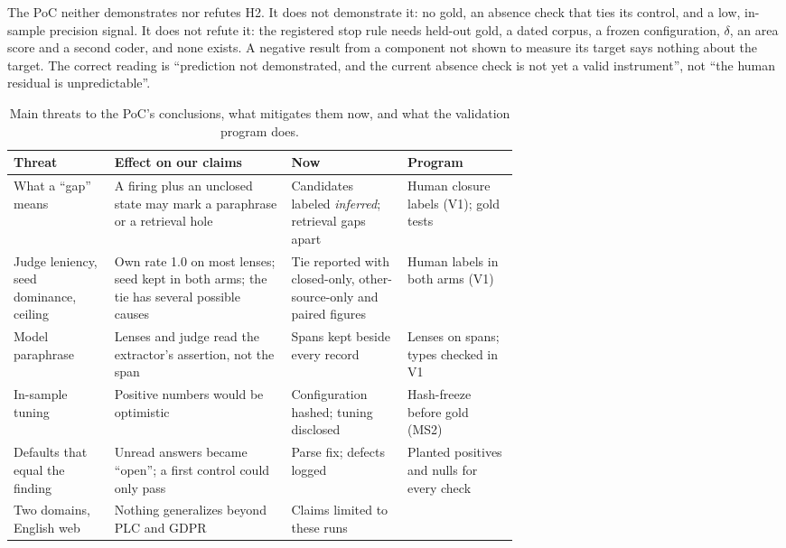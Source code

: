 \begin{findingbox}
  The PoC neither demonstrates nor refutes H2. It does not demonstrate it: no gold, an absence check
  that ties its control, and a low, in-sample precision signal. It does not refute it: the registered
  stop rule needs held-out gold, a dated corpus, a frozen configuration, $\delta$, an area score and a
  second coder, and none exists. A negative result from a component not shown to measure its target
  says nothing about the target. The correct reading is \enquote{prediction not demonstrated, and the
  current absence check is not yet a valid instrument}, not \enquote{the human residual is
  unpredictable}.
\end{findingbox}

\begin{table}[tbp]
  \centering\footnotesize
  \caption{Main threats to the PoC's conclusions, what mitigates them now, and what the validation
    program does.}
  \label{tab:threats}
  \begin{tabularx}{\linewidth}{@{}>{\raggedright\arraybackslash}p{0.2\linewidth}
      >{\raggedright\arraybackslash}X>{\raggedright\arraybackslash}p{0.23\linewidth}
      >{\raggedright\arraybackslash}p{0.22\linewidth}@{}}
    \toprule
    Threat & Effect on our claims & Now & Program \\
    \midrule
    What a \enquote{gap} means & A firing plus an unclosed state may mark a paraphrase or a retrieval
      hole & Candidates labeled \emph{inferred}; retrieval gaps apart & Human closure labels (V1);
      gold tests \\
    Judge leniency, seed dominance, ceiling & Own rate 1.0 on most lenses; seed kept in both arms;
      the tie has several possible causes & Tie reported with closed-only, other-source-only and paired
      figures & Human labels in both arms (V1) \\
    Model paraphrase & Lenses and judge read the extractor's assertion, not the span & Spans kept
      beside every record & Lenses on spans; types checked in V1 \\
    In-sample tuning & Positive numbers would be optimistic & Configuration hashed; tuning disclosed &
      Hash-freeze before gold (MS2) \\
    Defaults that equal the finding & Unread answers became \enquote{open}; a first control could only
      pass & Parse fix; defects logged & Planted positives and nulls for every check \\
    Two domains, English web & Nothing generalizes beyond PLC and GDPR & Claims limited to these runs

\end{tabularx}
\end{table}
